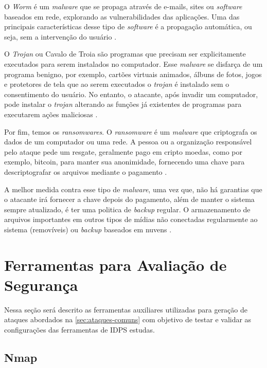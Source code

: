 O \textit{Worm} é um \textit{malware} que se propaga através de e-mails, sites ou \textit{software} baseados em rede, explorando as vulnerabilidades das aplicações. Uma das principais características desse tipo de \textit{software} é a propagação automática, ou seja, sem a intervenção do usuário \cite{detectingworm}. 

O \textit{Trojan} ou Cavalo de Troia são programas que precisam ser explicitamente executados para serem instalados no computador. Esse \textit{malware} se disfarça de um programa benigno, por exemplo, cartões virtuais animados, álbuns de fotos, jogos e protetores de tela que ao serem executados o \textit{trojan} é instalado sem o consentimento do usuário. No entanto, o atacante, após invadir um computador, pode instalar o \textit{trojan} alterando as funções já existentes de programas para executarem ações maliciosas \cite{certs-malwares}.

Por fim, temos os \textit{ransomwares}. O \textit{ransomware} é um \textit{malware} que criptografa os dados de um computador ou uma rede. A pessoa ou a organização responsável pelo ataque pede um resgate, geralmente pago em cripto moedas, como por exemplo, bitcoin, para manter sua anonimidade, fornecendo uma chave para descriptografar os arquivos mediante o pagamento \cite{ransomware:matt}.

A melhor medida contra esse tipo de \textit{malware}, uma vez que, não há garantias que o atacante irá fornecer a chave depois do pagamento, além de manter o sistema sempre atualizado, é ter uma politica de \textit{backup} regular. O armazenamento de arquivos importantes em outros tipos de mídias não conectadas regularmente ao sistema (removíveis) ou \textit{backup} baseados em nuvens \cite{ransomware:matt}.

\section{Ferramentas para Avaliação de Segurança} \label{sec:ferramentas}

Nessa seção será descrito as ferramentas auxiliares utilizadas para geração de ataques abordados na \autoref{sec:ataques-comuns} com objetivo de testar e validar as configurações das ferramentas de IDPS estudas. 

 \subsection{Nmap} \label{sec:nmap}

